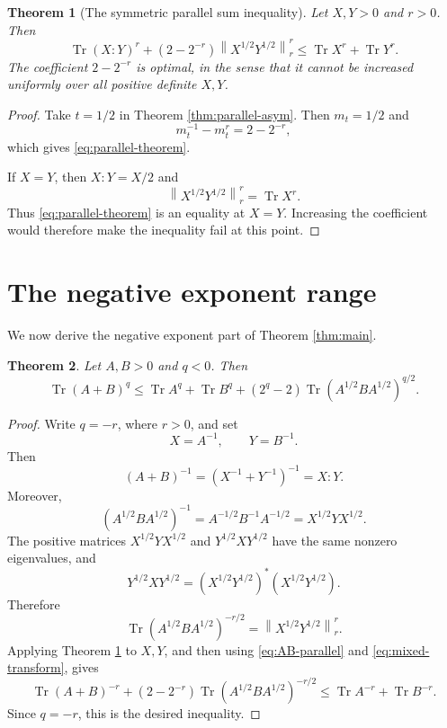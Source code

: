 \documentclass[11pt]{amsart}
\numberwithin{equation}{section}
\newtheorem{theorem}{Theorem}[section]
\newcommand{\Tr}{\operatorname{Tr}}
\newcommand{\norm}[1]{\left\lVert #1\right\rVert}
\begin{document}
\begin{theorem}[The symmetric parallel sum inequality]\label{thm:parallel}
Let \(X,Y>0\) and \(r>0\).  Then
\begin{equation}\label{eq:parallel-theorem}
    \Tr(X:Y)^r+
    \left(2-2^{-r}\right)\norm{X^{1/2}Y^{1/2}}_r^r
    \le
    \Tr X^r+\Tr Y^r.
\end{equation}
The coefficient \(2-2^{-r}\) is optimal, in the sense that it cannot be increased uniformly over all positive definite \(X,Y\).
\end{theorem}

\begin{proof}
Take \(t=1/2\) in Theorem \ref{thm:parallel-asym}.  Then \(m_t=1/2\) and
\[
    m_t^{-1}-m_t^r=2-2^{-r},
\]
which gives \eqref{eq:parallel-theorem}.

If \(X=Y\), then \(X:Y=X/2\) and
\[
    \norm{X^{1/2}Y^{1/2}}_r^r=\Tr X^r.
\]
Thus \eqref{eq:parallel-theorem} is an equality at \(X=Y\).  Increasing the coefficient would therefore make the inequality fail at this point.
\end{proof}

\section{The negative exponent range}\label{sec:negative}

We now derive the negative exponent part of Theorem \ref{thm:main}.

\begin{theorem}\label{thm:negative}
Let \(A,B>0\) and \(q<0\).  Then
\[
    \Tr(A+B)^q
    \le
    \Tr A^q+\Tr B^q+
    (2^q-2)\Tr(A^{1/2}BA^{1/2})^{q/2}.
\]
\end{theorem}

\begin{proof}
Write \(q=-r\), where \(r>0\), and set
\[
    X=A^{-1},\qquad Y=B^{-1}.
\]
Then
\begin{equation}\label{eq:AB-parallel}
    (A+B)^{-1}=(X^{-1}+Y^{-1})^{-1}=X:Y.
\end{equation}
Moreover,
\[
    (A^{1/2}BA^{1/2})^{-1}
    =
    A^{-1/2}B^{-1}A^{-1/2}
    =
    X^{1/2}YX^{1/2}.
\]
The positive matrices \(X^{1/2}YX^{1/2}\) and \(Y^{1/2}XY^{1/2}\) have the same nonzero eigenvalues, and
\[
    Y^{1/2}XY^{1/2}
    =
    (X^{1/2}Y^{1/2})^*(X^{1/2}Y^{1/2}).
\]
Therefore
\begin{equation}\label{eq:mixed-transform}
    \Tr(A^{1/2}BA^{1/2})^{-r/2}
    =
    \norm{X^{1/2}Y^{1/2}}_r^r.
\end{equation}
Applying Theorem \ref{thm:parallel} to \(X,Y\), and then using \eqref{eq:AB-parallel} and \eqref{eq:mixed-transform}, gives
\[
    \Tr(A+B)^{-r}
    +
    \left(2-2^{-r}\right)
    \Tr(A^{1/2}BA^{1/2})^{-r/2}
    \le
    \Tr A^{-r}+\Tr B^{-r}.
\]
Since \(q=-r\), this is the desired inequality.
\end{proof}
\end{document}
